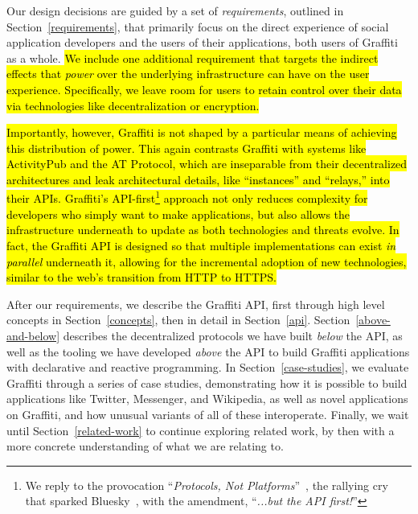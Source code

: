 Our design decisions are guided by a set of \emph{requirements}, outlined
in Section~\ref{requirements}, that primarily focus on the direct experience
of social application developers and the users of their applications,
both users of Graffiti as a whole.
\hl{%
We include one additional requirement that targets the indirect
effects that \emph{power} over the underlying infrastructure
can have on the user experience.
Specifically, we leave room for users to retain control over their data
via technologies like decentralization or encryption.
}%

\hl{%
Importantly, however, Graffiti is not shaped by a particular
means of achieving this distribution of power. This again contrasts Graffiti
with systems like ActivityPub and the AT Protocol,
which are inseparable from their decentralized architectures
and leak architectural details, like ``instances'' and ``relays,''
into their APIs.
Graffiti's API-first\footnote{
We reply to the provocation ``\emph{Protocols, Not Platforms}''~{\cite{protocolsnotplatforms}},
the rallying cry that sparked Bluesky~{\cite{bluesky_from_protocols}},
with the amendment, ``\emph{...but the API first!}''
} approach not only reduces complexity for
developers who simply want to make applications,
but also allows the infrastructure underneath
to update as both technologies and threats evolve.
In fact, the Graffiti API is designed so that multiple implementations can exist
\emph{in parallel} underneath it,
allowing for the incremental adoption of new technologies,
similar to the web's transition from HTTP to HTTPS.
}%

After our requirements, we describe the Graffiti API,
first through high level concepts in Section~\ref{concepts},
then in detail in Section~\ref{api}.
Section~\ref{above-and-below} describes
the decentralized protocols we have built \emph{below} the API,
as well as the tooling we have developed \emph{above} the API
to build Graffiti applications with declarative and reactive programming.
In Section~\ref{case-studies},
we evaluate Graffiti through a series of case studies, demonstrating
how it is possible to build applications like Twitter, Messenger, and
Wikipedia, as well as novel applications on Graffiti, and how unusual
variants of all of these interoperate.
Finally, we wait until Section~\ref{related-work}
to continue exploring related work, by then with a more concrete
understanding of what we are relating to.
